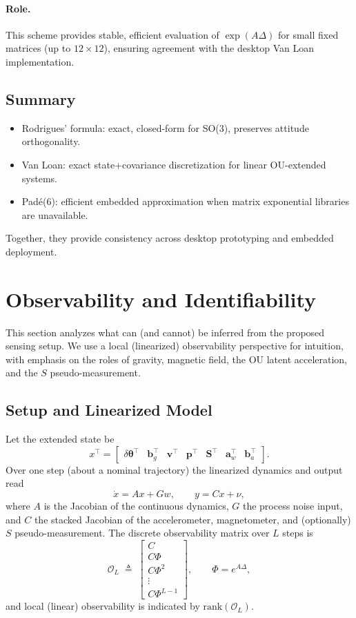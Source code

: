 \documentclass[10pt]{extarticle}
\begin{document}
\paragraph{Role.}
This scheme provides stable, efficient evaluation of $\exp(A\Delta)$ for
small fixed matrices (up to $12\times 12$), ensuring agreement with the
desktop Van Loan implementation.

\subsection{Summary}
\begin{itemize}
\item Rodrigues’ formula: exact, closed-form for SO(3), preserves attitude orthogonality.
\item Van Loan: exact state+covariance discretization for linear OU-extended systems.
\item Pad\'e(6): efficient embedded approximation when matrix exponential libraries are unavailable.
\end{itemize}
Together, they provide consistency across desktop prototyping and embedded deployment.

\section{Observability and Identifiability}
\label{sec:observability}

This section analyzes what can (and cannot) be inferred from the proposed sensing setup.
We use a local (linearized) observability perspective for intuition, with emphasis on
the roles of gravity, magnetic field, the OU latent acceleration, and the $S$ pseudo-measurement.

\subsection{Setup and Linearized Model}
Let the extended state be
\[
x^\top=\begin{bmatrix}
\delta\bm\theta^\top & \bm b_g^\top & \bm v^\top & \bm p^\top & \bm S^\top & \bm a_w^\top & \bm b_a^\top
\end{bmatrix}.
\]
Over one step (about a nominal trajectory) the linearized dynamics and output read
\begin{equation}
\dot x = A x + G w,
\qquad
y = C x + \nu,
\label{eq:lin-obs}
\end{equation}
where $A$ is the Jacobian of the continuous dynamics, $G$ the process noise input, and
$C$ the stacked Jacobian of the accelerometer, magnetometer, and (optionally) $S$ pseudo-measurement.
The discrete observability matrix over $L$ steps is
\begin{equation}
\mathcal{O}_L \;\triangleq\; \begin{bmatrix}
C\\
C\Phi\\
C\Phi^2\\
\vdots\\
C\Phi^{L-1}
\end{bmatrix},
\qquad
\Phi = e^{A\Delta},
\label{eq:obs-matrix}
\end{equation}
and local (linear) observability is indicated by $\mathrm{rank}(\mathcal{O}_L)$.
\end{document}
